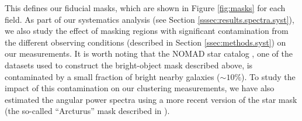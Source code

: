 \documentclass[a4paper,11pt]{article}
\begin{document}
    This defines our fiducial masks, which are shown in Figure \ref{fig:masks} for each field. As part of our systematics analysis (see Section \ref{sssec:results.spectra.syst}), we also study the effect of masking regions with significant contamination from the different observing conditions (described in Section \ref{ssec:methods.syst}) on our measurements. It is worth noting that the NOMAD star catalog \cite{2004AAS...205.4815Z}, one of the datasets used to construct the bright-object mask described above, is contaminated by a small fraction of bright nearby galaxies ($\sim10\%$). To study the impact of this contamination on our clustering measurements, we have also estimated the angular power spectra using a more recent version of the star mask (the so-called ``Arcturus'' mask described in \cite{2018PASJ...70S...7C}).
\end{document}
